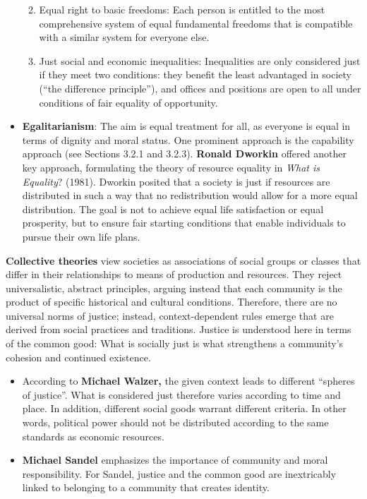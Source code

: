 \documentclass[
  a4paper,
  openany]{book}
\begin{document}
\begin{tcolorbox}
\begin{itemize}
  \begin{enumerate}
  \def\labelenumi{\arabic{enumi}.}
  \item
    Equal right to basic freedoms: Each person is entitled to the most
    comprehensive system of equal fundamental freedoms that is
    compatible with a similar system for everyone else.
  \item
    Just social and economic inequalities: Inequalities are only
    considered just if they meet two conditions: they benefit the least
    advantaged in society (``the difference principle''), and offices
    and positions are open to all under conditions of fair equality of
    opportunity.
  \end{enumerate}
\item
  \textbf{Egalitarianism}: The aim is equal treatment for all, as
  everyone is equal in terms of dignity and moral status. One prominent
  approach is the capability approach (see Sections 3.2.1 and 3.2.3).
  \textbf{Ronald Dworkin} offered another key approach, formulating the
  theory of resource equality in \emph{What is Equality}? (1981).
  Dworkin posited that a society is just if resources are distributed in
  such a way that no redistribution would allow for a more equal
  distribution. The goal is not to achieve equal life satisfaction or
  equal prosperity, but to ensure fair starting conditions that enable
  individuals to pursue their own life plans.
\end{itemize}

\textbf{Collective theories} view societies as associations of social
groups or classes that differ in their relationships to means of
production and resources. They reject universalistic, abstract
principles, arguing instead that each community is the product of
specific historical and cultural conditions. Therefore, there are no
universal norms of justice; instead, context-dependent rules emerge that
are derived from social practices and traditions. Justice is understood
here in terms of the common good: What is socially just is what
strengthens a community's cohesion and continued existence.

\begin{itemize}
\item
  According to \textbf{Michael Walzer,} the given context leads to
  different ``spheres of justice''. What is considered just therefore
  varies according to time and place. In addition, different social
  goods warrant different criteria. In other words, political power
  should not be distributed according to the same standards as economic
  resources.
\item
  \textbf{Michael Sandel} emphasizes the importance of community and
  moral responsibility. For Sandel, justice and the common good are
  inextricably linked to belonging to a community that creates identity.
\end{itemize}

\end{tcolorbox}
\end{document}
